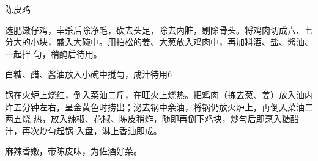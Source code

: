 \begin{recipe}{陈皮鸡}

\ingredients


\cooking

\step 选肥嫩仔鸡，宰杀后除净毛，砍去头足，除去内脏，剔除骨头。将鸡肉切成六、七
分大的小块，盛入大碗中。用拍松的姜、大葱放入鸡肉中，再加料酒、盐、酱油、一起拌
匀，稍醃后待用。

\step 白糖、醋、酱油放入小碗中搅匀，成汁待用6

\step 锅在火炉上烧红，倒入菜油二斤，在旺火上烧热。把鸡肉（拣去葱、姜）放入油内
炸五分钟左右，呈金黄色时捞出；泌去锅中余油，将锅仍放火炉上，再倒入菜油二两五烧
热，放入辣椒、花椒、陈皮稍炸，随即再倒下鸡块，炒勻后即烹入糖醋汁，再次炒勻起锅
入盘，淋上香油即成。

\notes

麻辣香嫩，带陈皮味，为佐酒好菜。

\end{recipe}

